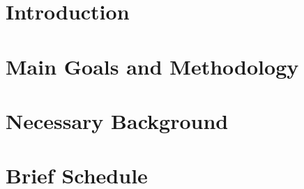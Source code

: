 \documentclass[12pt,a4paper]{article}
\makeatletter
\renewcommand\tableofcontents{%
    \section*{\huge\centering\contentsname
        \@mkboth{%
           \MakeUppercase\contentsname}{\MakeUppercase\contentsname}}%
           \vspace{24pt}%
    \@starttoc{toc}%
    \newpage%
}
\numberwithin{equation}{section} %
\makeatother
\begin{document}
\setcounter{page}{1}
\pagestyle{plain} %

\section{Introduction}
\label{section:introducao}


\section{Main Goals and Methodology}
\label{section:objetivos}


\section{Necessary Background}
\label{section:Materiais&Metodos}


\section{Brief Schedule}
\label{section:Planos&Cronograma}




\end{document}
